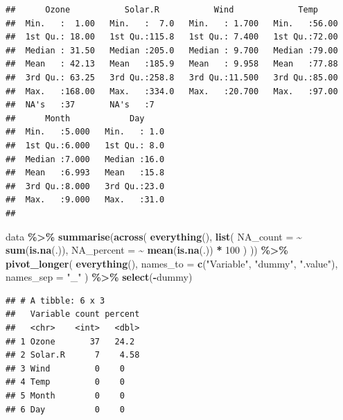 \documentclass[
]{book}
\newenvironment{Shaded}{\begin{snugshade}}{\end{snugshade}}
\newcommand{\AttributeTok}[1]{\textcolor[rgb]{0.13,0.29,0.53}{#1}}
\newcommand{\DecValTok}[1]{\textcolor[rgb]{0.00,0.00,0.81}{#1}}
\newcommand{\FunctionTok}[1]{\textcolor[rgb]{0.13,0.29,0.53}{\textbf{#1}}}
\newcommand{\NormalTok}[1]{#1}
\newcommand{\SpecialCharTok}[1]{\textcolor[rgb]{0.81,0.36,0.00}{\textbf{#1}}}
\newcommand{\StringTok}[1]{\textcolor[rgb]{0.31,0.60,0.02}{#1}}
\begin{document}
\begin{verbatim}
##      Ozone           Solar.R           Wind             Temp      
##  Min.   :  1.00   Min.   :  7.0   Min.   : 1.700   Min.   :56.00  
##  1st Qu.: 18.00   1st Qu.:115.8   1st Qu.: 7.400   1st Qu.:72.00  
##  Median : 31.50   Median :205.0   Median : 9.700   Median :79.00  
##  Mean   : 42.13   Mean   :185.9   Mean   : 9.958   Mean   :77.88  
##  3rd Qu.: 63.25   3rd Qu.:258.8   3rd Qu.:11.500   3rd Qu.:85.00  
##  Max.   :168.00   Max.   :334.0   Max.   :20.700   Max.   :97.00  
##  NA's   :37       NA's   :7                                       
##      Month            Day      
##  Min.   :5.000   Min.   : 1.0  
##  1st Qu.:6.000   1st Qu.: 8.0  
##  Median :7.000   Median :16.0  
##  Mean   :6.993   Mean   :15.8  
##  3rd Qu.:8.000   3rd Qu.:23.0  
##  Max.   :9.000   Max.   :31.0  
## 
\end{verbatim}

\begin{Shaded}
\begin{Highlighting}[]
\NormalTok{data }\SpecialCharTok{\%\textgreater{}\%}
  \FunctionTok{summarise}\NormalTok{(}\FunctionTok{across}\NormalTok{(}
    \FunctionTok{everything}\NormalTok{(),}
    \FunctionTok{list}\NormalTok{(}
      \AttributeTok{NA\_count   =} \SpecialCharTok{\textasciitilde{}} \FunctionTok{sum}\NormalTok{(}\FunctionTok{is.na}\NormalTok{(.)),}
      \AttributeTok{NA\_percent =} \SpecialCharTok{\textasciitilde{}} \FunctionTok{mean}\NormalTok{(}\FunctionTok{is.na}\NormalTok{(.)) }\SpecialCharTok{*} \DecValTok{100}
\NormalTok{    )}
\NormalTok{  )) }\SpecialCharTok{\%\textgreater{}\%}
  \FunctionTok{pivot\_longer}\NormalTok{(}
    \FunctionTok{everything}\NormalTok{(),}
    \AttributeTok{names\_to =} \FunctionTok{c}\NormalTok{(}\StringTok{"Variable"}\NormalTok{, }\StringTok{"dummy"}\NormalTok{, }\StringTok{".value"}\NormalTok{),}
    \AttributeTok{names\_sep =} \StringTok{"\_"}
\NormalTok{  ) }\SpecialCharTok{\%\textgreater{}\%}
  \FunctionTok{select}\NormalTok{(}\SpecialCharTok{{-}}\NormalTok{dummy)   }
\end{Highlighting}
\end{Shaded}

\begin{verbatim}
## # A tibble: 6 x 3
##   Variable count percent
##   <chr>    <int>   <dbl>
## 1 Ozone       37   24.2 
## 2 Solar.R      7    4.58
## 3 Wind         0    0   
## 4 Temp         0    0   
## 5 Month        0    0   
## 6 Day          0    0
\end{verbatim}
\end{document}
